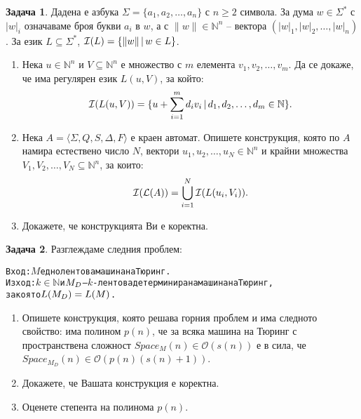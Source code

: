 \documentclass[a4paper]{article}
\theoremstyle{definition}
\newtheorem{problem}{Задача}
\begin{document}
\begin{problem}
Дадена е азбука $\Sigma=\{a_1,a_2,\dots,a_n\}$ с $n\ge 2$ символа. За дума $w\in \Sigma^*$ с $|w|_i$ означаваме броя букви $a_i$ в $w$,
а с $\|w\|\in \mathbb{N}^n$ -- вектора $(|w|_1,|w|_2,\dots,|w|_n)$. За език $L\subseteq \Sigma^*$, ${\cal I}(L)=\{\|w\| \,|\, w\in L\}$.
\begin{enumerate}
\item Нека $u\in \mathbb{N}^n$ и $V\subseteq \mathbb{N}^n$ е множество с $m$ елемента $v_1,v_2,\dots,v_m$. Да се докаже, че има регулярен език $L(u,V)$, за който:
\begin{equation*}
{\cal I}(L(u,V)) = \{u +\sum_{i=1}^m d_i v_i\,|\, d_1,d_2,\dots,d_m\in \mathbb{N}\}.
\end{equation*}
\item Нека $A=\langle \Sigma,Q,S,\Delta,F\rangle$ е краен автомат. Опишете конструкция, която по $A$ намира естествено число $N$, вектори $u_1,u_2,\dots,u_N\in \mathbb{N}^n$ и крайни множества $V_1,V_2,\dots,V_N\subseteq \mathbb{N}^n$, за които:
\begin{equation*}
{\cal I}({\cal L}(A)) = \bigcup_{i=1}^N {\cal I}(L(u_i,V_i)).
\end{equation*} 
\item Докажете, че конструкцията Ви е коректна.
\end{enumerate}
\end{problem}
\begin{problem}
Разглеждаме следния проблем:
\begin{alltt}
Вход:\(M\) еднолентова машина на Тюринг.
Изход:\(k\in\mathbb{N}\) и \(M\sb{D}\) -- \(k\)-лентова детерминирана машина на Тюринг, 
\hspace{5cm}за която \(L(M\sb{D})=L(M)\).
\end{alltt}
\begin{enumerate}
\item Опишете конструкция, която решава горния проблем и има следното свойство: има полином $p(n)$, че за всяка машина на Тюринг
с пространствена сложност $Space_M(n) \in \mathcal{O}(s(n))$ е в сила, че $Space_{M_D}(n) \in \mathcal{O}(p(n)(s(n)+1))$.
\item Докажете, че Вашата конструкция е коректна.
\item Оценете степента на полинома $p(n)$.
\end{enumerate}
\end{problem}
\end{document}

